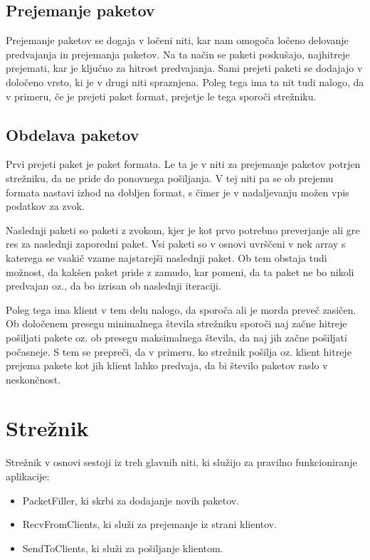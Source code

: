 \documentclass[journal]{IEEEtran}
\begin{document}
\subsection{Prejemanje paketov}
Prejemanje paketov se dogaja v ločeni niti, kar nam omogoča ločeno delovanje predvajanja in prejemanja paketov. Na ta način se paketi poskušajo, najhitreje prejemati, kar je ključno za hitrost predvajanja. Sami prejeti paketi se dodajajo v določeno vrsto, ki je v drugi niti spraznjena. Poleg tega ima ta nit tudi nalogo, da v primeru, če je prejeti paket format, prejetje le tega sporoči strežniku.

\subsection{Obdelava paketov}
Prvi prejeti paket je paket formata. Le ta je v niti za prejemanje paketov potrjen strežniku, da ne pride do ponovnega pošiljanja. V tej niti pa se ob prejemu formata nastavi izhod na dobljen format, s čimer je v nadaljevanju možen vpis podatkov za zvok.

Naslednji paketi so paketi z zvokom, kjer je kot prvo potrebno preverjanje ali gre res za naslednji zaporedni paket. Vsi paketi so v osnovi uvrščeni v nek array s katerega se vsakič vzame najstarejši naslednji paket. Ob tem obstaja tudi možnost, da kakšen paket pride z zamudo, kar pomeni, da ta paket ne bo nikoli predvajan oz., da bo izrisan ob naslednji iteraciji.

Poleg tega ima klient v tem delu nalogo, da sporoča ali je morda preveč zasičen. Ob določenem presegu minimalnega števila strežniku sporoči naj začne hitreje pošiljati pakete oz. ob presegu maksimalnega števila, da naj jih začne pošiljati počasneje. S tem se prepreči, da v primeru, ko strežnik pošilja oz. klient hitreje prejema pakete kot jih klient lahko predvaja, da bi število paketov raslo v neskončnost.


\section{Strežnik}
Strežnik v osnovi sestoji iz treh glavnih niti, ki služijo za pravilno funkcioniranje aplikacije:
\begin{itemize}
	\item PacketFiller, ki skrbi za dodajanje novih paketov.
	\item RecvFromClients, ki služi za prejemanje iz strani klientov.
	\item SendToClients, ki služi za pošiljanje klientom.
\end{itemize}
\end{document}
